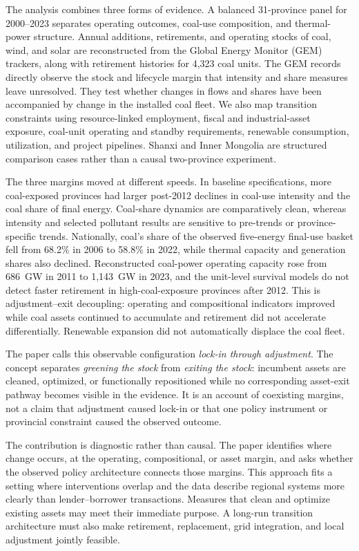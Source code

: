 \documentclass[11pt]{article}
\begin{document}
The analysis combines three forms of evidence. A balanced 31-province panel for 2000--2023 separates operating outcomes, coal-use composition, and thermal-power structure. Annual additions, retirements, and operating stocks of coal, wind, and solar are reconstructed from the Global Energy Monitor (GEM) trackers, along with retirement histories for 4,323 coal units. The GEM records directly observe the stock and lifecycle margin that intensity and share measures leave unresolved. They test whether changes in flows and shares have been accompanied by change in the installed coal fleet. We also map transition constraints using resource-linked employment, fiscal and industrial-asset exposure, coal-unit operating and standby requirements, renewable consumption, utilization, and project pipelines. Shanxi and Inner Mongolia are structured comparison cases rather than a causal two-province experiment.

The three margins moved at different speeds. In baseline specifications, more coal-exposed provinces had larger post-2012 declines in coal-use intensity and the coal share of final energy. Coal-share dynamics are comparatively clean, whereas intensity and selected pollutant results are sensitive to pre-trends or province-specific trends. Nationally, coal's share of the observed five-energy final-use basket fell from 68.2\% in 2006 to 58.8\% in 2022, while thermal capacity and generation shares also declined. Reconstructed coal-power operating capacity rose from 686~GW in 2011 to 1,143~GW in 2023, and the unit-level survival models do not detect faster retirement in high-coal-exposure provinces after 2012. This is adjustment--exit decoupling: operating and compositional indicators improved while coal assets continued to accumulate and retirement did not accelerate differentially. Renewable expansion did not automatically displace the coal fleet.

The paper calls this observable configuration \textit{lock-in through adjustment}. The concept separates \textit{greening the stock} from \textit{exiting the stock}: incumbent assets are cleaned, optimized, or functionally repositioned while no corresponding asset-exit pathway becomes visible in the evidence. It is an account of coexisting margins, not a claim that adjustment caused lock-in or that one policy instrument or provincial constraint caused the observed outcome.

The contribution is diagnostic rather than causal. The paper identifies where change occurs, at the operating, compositional, or asset margin, and asks whether the observed policy architecture connects those margins. This approach fits a setting where interventions overlap and the data describe regional systems more clearly than lender--borrower transactions. Measures that clean and optimize existing assets may meet their immediate purpose. A long-run transition architecture must also make retirement, replacement, grid integration, and local adjustment jointly feasible.
\end{document}
